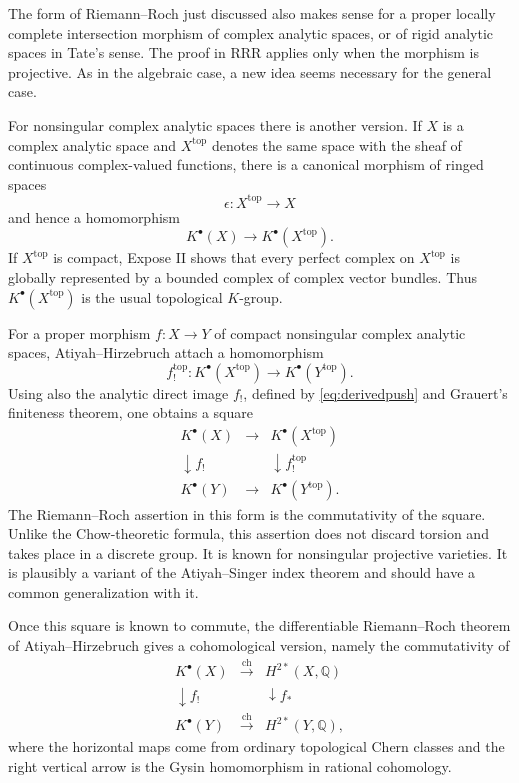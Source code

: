 \documentclass[14pt]{extarticle}
\newcommand{\QQ}{\mathbb Q}
\newcommand{\ch}{\operatorname{ch}}
\begin{document}
The form of Riemann--Roch just discussed also makes sense for a proper locally complete intersection morphism of complex analytic spaces, or of rigid analytic spaces in Tate's sense. The proof in RRR applies only when the morphism is projective. As in the algebraic case, a new idea seems necessary for the general case.

For nonsingular complex analytic spaces there is another version. If $X$ is a complex analytic space and $X^{\mathrm{top}}$ denotes the same space with the sheaf of continuous complex-valued functions, there is a canonical morphism of ringed spaces
\[
   \epsilon:X^{\mathrm{top}}\to X
\]
and hence a homomorphism
\begin{equation}\label{eq:topK}
   K^{\bullet}(X)\to K^{\bullet}(X^{\mathrm{top}}).
\end{equation}
If $X^{\mathrm{top}}$ is compact, Expose II shows that every perfect complex on $X^{\mathrm{top}}$ is globally represented by a bounded complex of complex vector bundles. Thus $K^{\bullet}(X^{\mathrm{top}})$ is the usual topological $K$-group.

For a proper morphism $f:X\to Y$ of compact nonsingular complex analytic spaces, Atiyah--Hirzebruch attach a homomorphism
\[
   f^{\mathrm{top}}_!:K^{\bullet}(X^{\mathrm{top}})\to K^{\bullet}(Y^{\mathrm{top}}).
\]
Using also the analytic direct image $f_!$, defined by \eqref{eq:derivedpush} and Grauert's finiteness theorem, one obtains a square
\[
\begin{array}{ccc}
K^{\bullet}(X) & \longrightarrow & K^{\bullet}(X^{\mathrm{top}}) \\
\downarrow f_! & & \downarrow f^{\mathrm{top}}_! \\
K^{\bullet}(Y) & \longrightarrow & K^{\bullet}(Y^{\mathrm{top}}).
\end{array}
\]
The Riemann--Roch assertion in this form is the commutativity of the square. Unlike the Chow-theoretic formula, this assertion does not discard torsion and takes place in a discrete group. It is known for nonsingular projective varieties. It is plausibly a variant of the Atiyah--Singer index theorem and should have a common generalization with it.

Once this square is known to commute, the differentiable Riemann--Roch theorem of Atiyah--Hirzebruch gives a cohomological version, namely the commutativity of
\[
\begin{array}{ccc}
K^{\bullet}(X) & \xrightarrow{\ch} & H^{2*}(X,\QQ) \\
\downarrow f_! & & \downarrow f_* \\
K^{\bullet}(Y) & \xrightarrow{\ch} & H^{2*}(Y,\QQ),
\end{array}
\]
where the horizontal maps come from ordinary topological Chern classes and the right vertical arrow is the Gysin homomorphism in rational cohomology.
\end{document}
